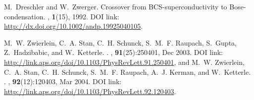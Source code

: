 \documentclass[a4paper,10pt]{article}
\begin{document}
\begin{thebibliography}{10}
M.~Dreschler and W.~Zwerger.
\newblock Crossover from {BCS}-superconductivity to {B}ose-condensation.
, \textbf{1}(15), 1992.
\newblock DOI link: \url{http://dx.doi.org/10.1002/andp.19925040105}.






M.~W. Zwierlein, C.~A. Stan, C.~H. Schunck, S.~M.~F. Raupach, S.~Gupta,
  Z.~Hadzibabic, and W.~Ketterle.
.
, \textbf{91}(25):250401, Dec 2003.
\newblock DOI link: \url{http://link.aps.org/doi/10.1103/PhysRevLett.91.250401}, and
\newblock M.~W. Zwierlein, C.~A. Stan, C.~H. Schunck, S.~M.~F. Raupach, A.~J. Kerman, and W.~Ketterle.
.
, \textbf{92}(12):120403, Mar 2004.
\newblock DOI link: \url{http://link.aps.org/doi/10.1103/PhysRevLett.92.120403}.


\end{thebibliography}
\end{document}
